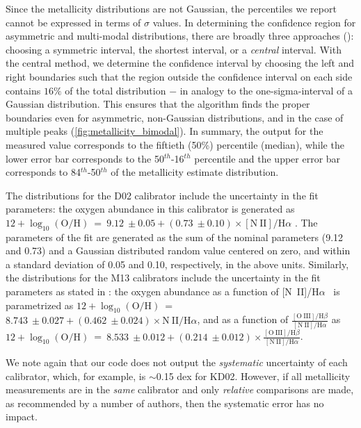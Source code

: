 \documentclass{emulateapj}
\newcommand{\oxabinline}{\ensuremath{12 + \log_{10}(\mathrm{O}/\mathrm{H})}}
\newcommand{\ha}{\ensuremath{\mathrm{H}\alpha}}
\begin{document}
Since the metallicity distributions are not Gaussian, the percentiles
we report cannot be expressed in terms of $\sigma$ values. In
determining the confidence region for asymmetric and multi-modal
distributions, there are broadly three approaches
(\citealt{andrae10}): choosing a symmetric interval, the shortest
interval, or a \emph{central} interval.  With the central method, we
determine the confidence interval by choosing the left and right
boundaries such that the region outside the confidence interval on
each side contains $16\%$ of the total distribution $-$ in analogy to
the one-sigma-interval of a Gaussian distribution. This ensures that
the algorithm finds the proper boundaries even for asymmetric,
non-Gaussian distributions, and in the case of multiple peaks
(\autoref{fig:metallicity_bimodal}). In summary, the output for the
measured value corresponds to the fiftieth (50\%) percentile (median),
while the lower error bar corresponds to the 50$^{th}$-16$^{th}$
percentile and the upper error bar corresponds to 84$^{th}$-50$^{th}$
of the metallicity estimate distribution.

The distributions for the D02 calibrator include the uncertainty in
the fit parameters: the oxygen abundance in this calibrator is
generated as \oxabinline~=~$9.12~\pm 0.05 + (0.73~\pm
0.10)\times\mathrm{[N~II]}/\ha$ \citep{denicolo02}. The parameters of
the fit are generated as the sum of the nominal parameters (9.12 and
0.73) and a Gaussian distributed random value centered on zero, and
within a standard deviation of 0.05 and 0.10, respectively, in the
above units.  Similarly, the distributions for the M13 calibrators
include the uncertainty in the fit parameters as stated in
\citet{marino13}: the oxygen abundance as a function of [N~II]/\ha~ is
parametrized as \oxabinline~=~$8.743~\pm 0.027 + (0.462~\pm
0.024)\times\mathrm{N~II}/\ha$, and as a function of
$\frac{\mathrm{[O~III]/H}\beta} {\mathrm{[N~II]/H}\alpha}$ as
\oxabinline~=~$8.533~\pm 0.012 + (0.214~\pm
0.012)\times\frac{\mathrm{[O~III]/H}\beta} {\mathrm{[N~II]/H}\alpha}$.

We note again that our code does not output the \emph{systematic}
uncertainty of each calibrator, which, for example, is $\sim$0.15
\nolinebreak dex for KD02. However, if all metallicity measurements
are in the \emph{same} calibrator and only \emph{relative} comparisons
are made, as recommended by a number of authors, then the systematic
error has no impact.
\end{document}
